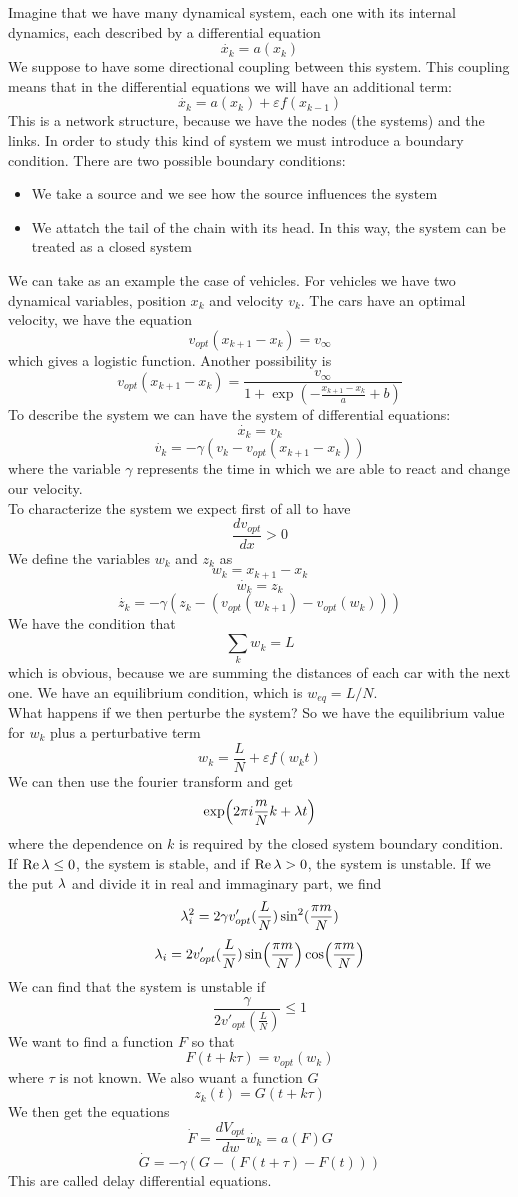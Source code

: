 Imagine that we have many dynamical system, each one with its internal dynamics, each described by a differential equation
$$
	\dot{x_k} = a(x_k)
$$
We suppose to have some directional coupling between this system. This coupling means that in the differential equations we will have an additional term:
$$
	\dot{x_k} = a(x_k) + \varepsilon f(x_{k-1})
$$
This is a network structure, because we have the nodes (the systems) and the links. In order to study this kind of system we must introduce a boundary condition. There are two possible boundary conditions:
\begin{itemize}
	\item We take a source and we see how the source influences the system	
	\item We attatch the tail of the chain with its head. In this way, the system can be treated as a closed system
\end{itemize}
We can take as an example the case of vehicles. For vehicles we have two dynamical variables, position $x_k$ and velocity $v_k$. The cars have an optimal velocity, we have the equation
$$
	v_{opt}(x_{k+1} - x_k) = v_\infty
$$
which gives a logistic function. Another possibility is
$$
	v_{opt}(x_{k+1} - x_k) = \frac{v_\infty}{1+ \exp(-\frac{x_{k+1} - x_k}{a} + b)}
$$
To describe the system we can have the system of differential equations:
$$
	\dot{x_k} = v_k
$$
$$
	\dot{v_k} = -\gamma(v_k - v_{opt}(x_{k+1}-x_k))
$$
where the variable $\gamma$ represents the time in which we are able to react and change our velocity. \\
To characterize the system we expect first of all to have
$$
	\frac{dv_{opt}}{dx} > 0
$$
We define the variables $w_k$ and $z_k$ as
$$
	w_k = x_{k+1} - x_k
$$
$$
	\dot{w_k} = z_k
$$
$$
	\dot{z_k} = -\gamma(z_k - (v_{opt}(w_{k+1}) - v_{opt}(w_k)))
$$
We have the condition that
$$
	\sum_k w_k = L
$$
which is obvious, because we are summing the distances of each car with the next one. We have an equilibrium condition, which is $w_{eq} = L/N$. \\
What happens if we then perturbe the system? So we have the equilibrium value for $w_k$ plus a perturbative term
$$
	w_k = \frac{L}{N} + \varepsilon f(w_k t)
$$
We can then use the fourier transform and get
$$
	\exp(2\pi i \frac{m}{N}k + \lambda t)
$$
where the dependence on $k$ is required by the closed system boundary condition. \\
If $\Re \lambda \leq 0$, the system is stable, and if $\Re \lambda > 0$, the system is unstable. If we the put $\lambda$ and divide it in real and immaginary part, we find
$$
	\lambda_i^2 = 2\gamma v'_{opt}(\frac{L}{N})\sin^2(\frac{\pi m}{N})
$$
$$
	\lambda_i = 2 v'_{opt}(\frac{L}{N})\sin(\frac{\pi m}{N})\cos(\frac{\pi m}{N})
$$
We can find that the system is unstable if 
$$
	\frac{\gamma}{2v'_{opt}(\frac{L}{N})} \leq 1
$$
We want to find a function $F$ so that 
$$
	F(t + k\tau) = v_{opt}(w_k)
$$
where $\tau$ is not known. We also wuant a function $G$ 
$$
	z_k(t) = G(t + k\tau)
$$
We then get the equations
$$
	\dot{F} = \frac{dV_{opt}}{dw}\dot{w_k} = a(F)G
$$
$$
	\dot{G} = -\gamma(G - (F(t + \tau) - F(t)))
$$
This are called delay differential equations.

